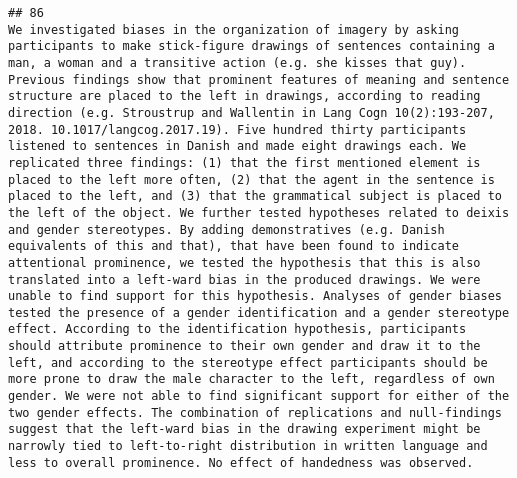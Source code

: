 \documentclass[
  english,
  man]{apa6}
\begin{document}
\begin{verbatim}
## 86                                                                                                                                                                                                                                                                                                                                                                                                                                                                                                                                                                                                                                                                                                                                                                           We investigated biases in the organization of imagery by asking participants to make stick-figure drawings of sentences containing a man, a woman and a transitive action (e.g. she kisses that guy). Previous findings show that prominent features of meaning and sentence structure are placed to the left in drawings, according to reading direction (e.g. Stroustrup and Wallentin in Lang Cogn 10(2):193-207, 2018. 10.1017/langcog.2017.19). Five hundred thirty participants listened to sentences in Danish and made eight drawings each. We replicated three findings: (1) that the first mentioned element is placed to the left more often, (2) that the agent in the sentence is placed to the left, and (3) that the grammatical subject is placed to the left of the object. We further tested hypotheses related to deixis and gender stereotypes. By adding demonstratives (e.g. Danish equivalents of this and that), that have been found to indicate attentional prominence, we tested the hypothesis that this is also translated into a left-ward bias in the produced drawings. We were unable to find support for this hypothesis. Analyses of gender biases tested the presence of a gender identification and a gender stereotype effect. According to the identification hypothesis, participants should attribute prominence to their own gender and draw it to the left, and according to the stereotype effect participants should be more prone to draw the male character to the left, regardless of own gender. We were not able to find significant support for either of the two gender effects. The combination of replications and null-findings suggest that the left-ward bias in the drawing experiment might be narrowly tied to left-to-right distribution in written language and less to overall prominence. No effect of handedness was observed.

\end{verbatim}
\end{document}
